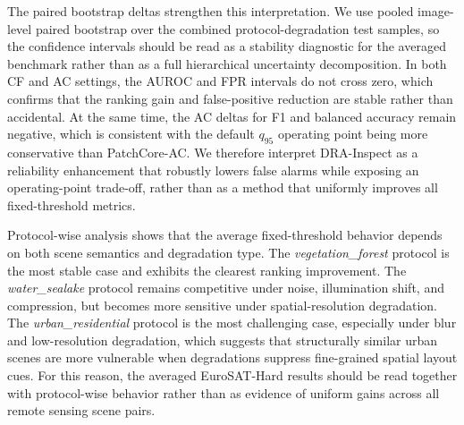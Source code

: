 \documentclass[remotesensing,article,submit,pdftex,moreauthors]{Definitions/mdpi}
\begin{document}
\begin{table}[!htbp]
\caption{Paired bootstrap delta analysis on EuroSAT-Hard using 1000 resamples over the pooled protocol-degradation test set. Confidence intervals directly compare DRA-Inspect against the corresponding PatchCore baseline.}
\label{tab:eurosat-hard-bootstrap-ci}
\centering
\small
\setlength{\tabcolsep}{4pt}
\end{table}

\noindent The paired bootstrap deltas strengthen this interpretation. We use pooled image-level paired bootstrap over the combined protocol-degradation test samples, so the confidence intervals should be read as a stability diagnostic for the averaged benchmark rather than as a full hierarchical uncertainty decomposition. In both CF and AC settings, the AUROC and FPR intervals do not cross zero, which confirms that the ranking gain and false-positive reduction are stable rather than accidental. At the same time, the AC deltas for F1 and balanced accuracy remain negative, which is consistent with the default $q_{95}$ operating point being more conservative than PatchCore-AC. We therefore interpret DRA-Inspect as a reliability enhancement that robustly lowers false alarms while exposing an operating-point trade-off, rather than as a method that uniformly improves all fixed-threshold metrics.

\noindent Protocol-wise analysis shows that the average fixed-threshold behavior depends on both scene semantics and degradation type. The \textit{vegetation\_forest} protocol is the most stable case and exhibits the clearest ranking improvement. The \textit{water\_sealake} protocol remains competitive under noise, illumination shift, and compression, but becomes more sensitive under spatial-resolution degradation. The \textit{urban\_residential} protocol is the most challenging case, especially under blur and low-resolution degradation, which suggests that structurally similar urban scenes are more vulnerable when degradations suppress fine-grained spatial layout cues. For this reason, the averaged EuroSAT-Hard results should be read together with protocol-wise behavior rather than as evidence of uniform gains across all remote sensing scene pairs.
\end{document}
